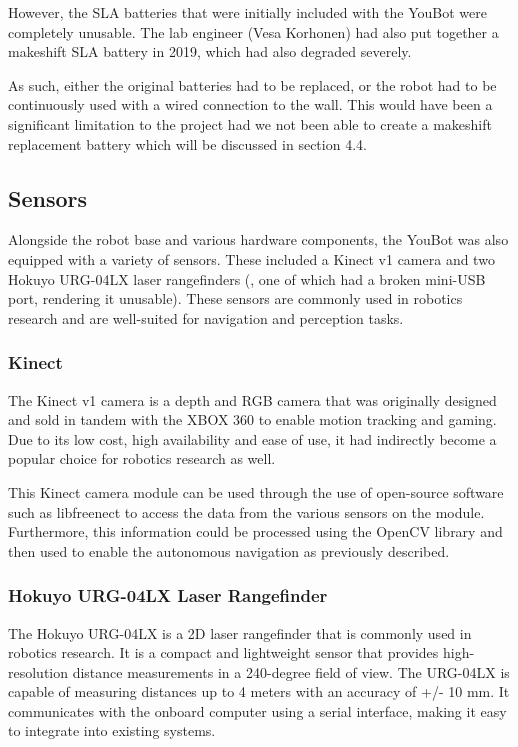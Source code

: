 \documentclass[a4paper, 12pt]{article}
\newif\ifshownotes
\newcommand{\notes}[1]{\ifshownotes\textcolor{blue}{#1}\fi}
\begin{document}
    However, the SLA batteries that were initially included with the YouBot were completely unusable. The lab engineer (Vesa Korhonen) had also put together a makeshift SLA battery in 2019, which had also degraded severely. 

    As such, either the original batteries had to be replaced, or the robot had to be continuously used with a wired connection to the wall. This would have been a significant limitation to the project had we not been able to create a makeshift replacement battery which will be discussed in section 4.4.
    

    \subsection{Sensors}
    
    Alongside the robot base and various hardware components, the YouBot was also equipped with a variety of sensors. These included a Kinect v1 camera and two Hokuyo URG-04LX laser rangefinders (, one of which had a broken mini-USB port, rendering it unusable). These sensors are commonly used in robotics research and are well-suited for navigation and perception tasks.

    \subsubsection{Kinect}  

    The Kinect v1 camera is a depth and RGB camera that was originally designed and sold in tandem with the XBOX 360 to enable motion tracking and gaming. Due to its low cost, high availability and ease of use, it had indirectly become a popular choice for robotics research as well.

    This Kinect camera module can be used through the use of open-source software such as libfreenect \notes{[cite]} to access the data from the various sensors on the module. Furthermore, this information could be processed using the OpenCV library and then used to enable the autonomous navigation as previously described. 

    \subsubsection{Hokuyo URG-04LX Laser Rangefinder}

    The Hokuyo URG-04LX is a 2D laser rangefinder that is commonly used in robotics research. It is a compact and lightweight sensor that provides high-resolution distance measurements in a 240-degree field of view. The URG-04LX is capable of measuring distances up to 4 meters with an accuracy of +/- 10 mm. It communicates with the onboard computer using a serial interface, making it easy to integrate into existing systems. 
\end{document}
